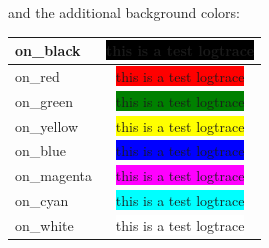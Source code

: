 and the additional background colors:
\begin{center}
\begin{tabular}{|l | c |}
  \hline
 on\_black & \colorbox{black}{\color{green}this is a test logtrace} \\
 \hline
 on\_red & \colorbox{red}{this is a test logtrace} \\
 \hline
on\_green & \colorbox{green}{this is a test logtrace} \\
 \hline
on\_yellow & \colorbox{yellow}{this is a test logtrace} \\
 \hline
 on\_blue & \colorbox{blue}{this is a test logtrace} \\
 \hline
 on\_magenta & \colorbox{magenta}{this is a test logtrace} \\
 \hline 
on\_cyan & \colorbox{cyan}{this is a test logtrace} \\
 \hline 
on\_white & \colorbox{white}{this is a test logtrace} \\
\hline
\end{tabular}
\end{center}


